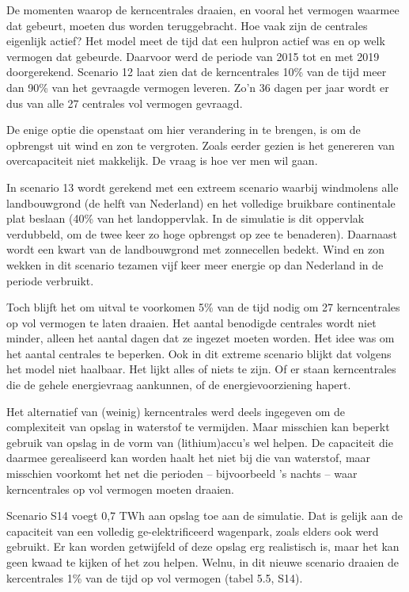\documentclass[
  11pt,
  a4paper,
]{book}
\begin{document}
De momenten waarop de kerncentrales draaien, en vooral het vermogen waarmee dat gebeurt, moeten dus worden teruggebracht. Hoe vaak zijn de centrales eigenlijk actief? Het model meet de tijd dat een hulpron actief was en op welk vermogen dat gebeurde. Daarvoor werd de periode van 2015 tot en met 2019 doorgerekend. Scenario 12 laat zien dat de kerncentrales 10\% van de tijd meer dan 90\% van het gevraagde vermogen leveren. Zo'n 36 dagen per jaar wordt er dus van alle 27 centrales vol vermogen gevraagd.

De enige optie die openstaat om hier verandering in te brengen, is om de opbrengst uit wind en zon te vergroten. Zoals eerder gezien is het genereren van overcapaciteit niet makkelijk. De vraag is hoe ver men wil gaan.

In scenario 13 wordt gerekend met een extreem scenario waarbij windmolens alle landbouwgrond (de helft van Nederland) en het volledige bruikbare continentale plat beslaan (40\% van het landoppervlak. In de simulatie is dit oppervlak verdubbeld, om de twee keer zo hoge opbrengst op zee te benaderen). Daarnaast wordt een kwart van de landbouwgrond met zonnecellen bedekt. Wind en zon wekken in dit scenario tezamen vijf keer meer energie op dan Nederland in de periode verbruikt.

Toch blijft het om uitval te voorkomen 5\% van de tijd nodig om 27 kerncentrales op vol vermogen te laten draaien. Het aantal benodigde centrales wordt niet minder, alleen het aantal dagen dat ze ingezet moeten worden.
Het idee was om het aantal centrales te beperken. Ook in dit extreme scenario blijkt dat volgens het model niet haalbaar. Het lijkt alles of niets te zijn. Of er staan kerncentrales die de gehele energievraag aankunnen, of de energievoorziening hapert.

Het alternatief van (weinig) kerncentrales werd deels ingegeven om de complexiteit van opslag in waterstof te vermijden. Maar misschien kan beperkt gebruik van opslag in de vorm van (lithium)accu's wel helpen. De capaciteit die daarmee gerealiseerd kan worden haalt het niet bij die van waterstof, maar misschien voorkomt het net die perioden -- bijvoorbeeld 's nachts -- waar kerncentrales op vol vermogen moeten draaien.

Scenario S14 voegt 0,7 TWh aan opslag toe aan de simulatie. Dat is gelijk aan de capaciteit van een volledig ge-elektrificeerd wagenpark, zoals elders ook werd gebruikt. Er kan worden getwijfeld of deze opslag erg realistisch is, maar het kan geen kwaad te kijken of het zou helpen. Welnu, in dit nieuwe scenario draaien de kercentrales 1\% van de tijd op vol vermogen (tabel 5.5, S14).
\end{document}
